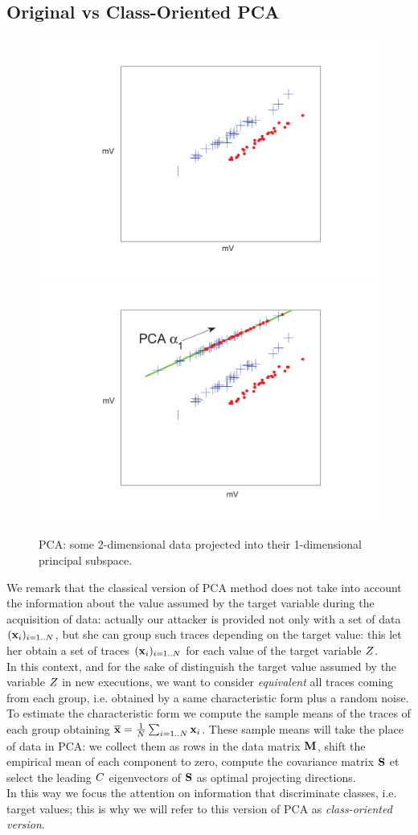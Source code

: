 \subsection{Original vs Class-Oriented PCA}
\begin{figure}
\includegraphics[width=.5\textwidth]{../Figures/PCA_LDA_geometric/dataNoProjection_mV2.pdf} 
\includegraphics[width=.5\textwidth]{../Figures/PCA_LDA_geometric/PCAprojection_mV2.pdf} 
\caption{PCA: some 2-dimensional data projected into their 1-dimensional principal subspace.}\label{fig:PCAunsupervised}
\end{figure}
We remark that the classical version of PCA method does not take into account the information about the value assumed by the target variable during the acquisition of data: actually our attacker is provided not only with a set of data $(\textbf{x}_{i})_{i=1..N}$, but she can group such traces depending on the target value: this let her obtain a set of traces $(\textbf{x}_{i})_{i=1..N}$ for each value of the target variable $Z$. \\
In this context, and for the sake of distinguish the target value assumed by the variable $Z$ in new executions, we want to consider {\em equivalent} all traces coming from each group, i.e. obtained by a same characteristic form plus a random noise. To estimate the characteristic form we compute the sample means of the traces of each group obtaining $\overline{\textbf{x}} = \frac{1}{N}\sum_{i=1..N} \textbf{x}_{i}$. These sample means will take the place of data in PCA: we collect them as rows in the data matrix $\textbf{M}$, shift the empirical mean of each component to zero, compute the covariance matrix $\textbf{S}$ et select the leading $C$ eigenvectors of $\textbf{S}$ as optimal projecting directions.\\
In this way we focus the attention on information that discriminate classes, i.e. target values; this is why we will refer to this version of PCA as {\em class-oriented version}. 

